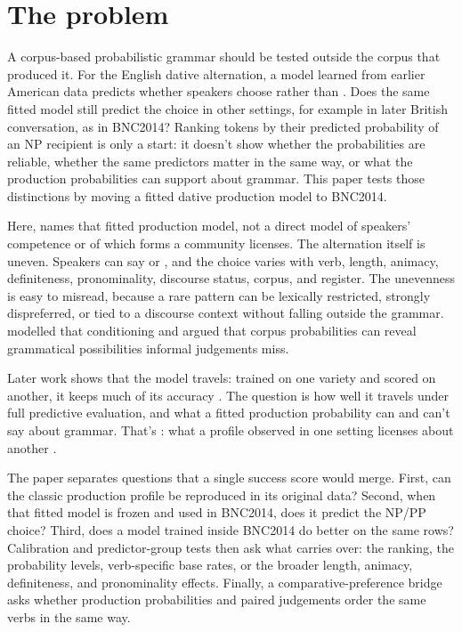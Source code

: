 \section{The problem}

A corpus-based probabilistic grammar should be tested outside the corpus that
produced it. For the English dative alternation, a model learned from earlier American data
predicts whether speakers choose  rather than
. Does the same fitted model still predict the
choice in other settings, for example in later British conversation, as in
BNC2014? Ranking tokens by
their predicted probability of an NP recipient is only a start: it doesn't show whether the probabilities are reliable, whether
the same predictors matter in the same way, or what the production probabilities
can support about grammar. This paper tests those distinctions by moving a
fitted dative production model to BNC2014.

Here,  names that fitted production model, not a
direct model of speakers' competence or of which forms a community licenses. The
alternation itself is uneven. Speakers can say  or
, and the choice varies with verb, length, animacy,
definiteness, pronominality, discourse status, corpus, and register. The
unevenness is easy to misread, because a rare pattern can be lexically
restricted, strongly dispreferred, or tied to a discourse context without
falling outside the grammar. \textcite{bresnan2007} modelled that conditioning
and argued that corpus probabilities can reveal grammatical possibilities
informal judgements miss.

Later work shows that the model travels: trained on one variety and scored on
another, it keeps much of its accuracy
\citep{BresnanHay2008,KendallBresnanVanHerk2011,EngelEtAl2025}. The question is
how well it travels under full predictive evaluation, and what a fitted
production probability can and can't say about grammar. That's
: what a profile observed in one setting licenses about
another \citep{Goodman1955}.

The paper separates questions that a single success score would merge. First,
can the classic production profile be reproduced in its original data? Second,
when that fitted model is frozen and used in BNC2014, does it predict the
NP/PP choice? Third, does a model trained inside BNC2014 do better on the same
rows? Calibration and predictor-group tests then ask what carries over: the
ranking, the probability levels, verb-specific base rates, or the broader
length, animacy, definiteness, and pronominality effects. Finally, a
comparative-preference bridge asks whether production probabilities and paired
judgements order the same verbs in the same way.
